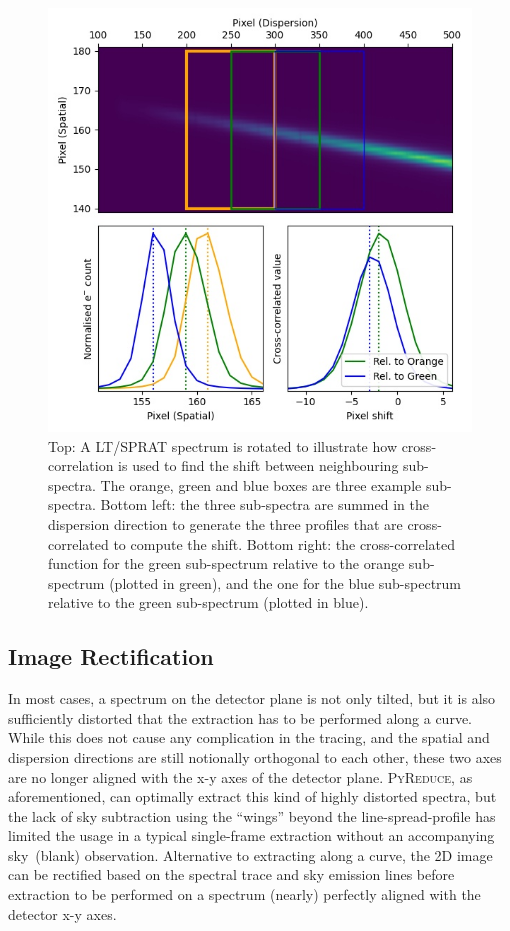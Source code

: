 \documentclass[fleqn,usenatbib]{mnras}
\begin{document}
\begin{figure}
    \centering
    \includegraphics[width=\columnwidth]{fig_01_tracing.jpg}
    \caption{Top: A LT/SPRAT spectrum is rotated to illustrate how
    cross-correlation is used to find the shift between neighbouring
    sub-spectra. The orange, green and blue boxes are three example
    sub-spectra. Bottom left: the three sub-spectra are summed in
    the dispersion direction to generate the three profiles that are
    cross-correlated to compute the shift. Bottom right: the
    cross-correlated function for the green sub-spectrum relative
    to the orange sub-spectrum (plotted in green), and the one
    for the blue sub-spectrum relative to the green sub-spectrum
    (plotted in blue).}
    \label{fig:trace}
\end{figure}


\subsection{Image Rectification}
In most cases, a spectrum on the detector plane is not only tilted,
but it is also sufficiently distorted that the extraction
has to be performed along a curve. While this does not cause any
complication in the tracing, and the spatial and dispersion
directions are still notionally orthogonal to each other, these two
axes are no longer aligned with the x-y axes of the detector plane.
\textsc{PyReduce}, as aforementioned, can optimally extract this
kind of highly distorted spectra, but the lack of sky subtraction
using the ``wings'' beyond the line-spread-profile has limited the
usage in a typical single-frame extraction without an accompanying
sky~(blank) observation. Alternative to extracting along a curve,
the 2D image can be rectified based on the spectral trace and sky
emission lines before extraction to be performed on a spectrum
(nearly) perfectly aligned with the detector x-y axes.
\end{document}
